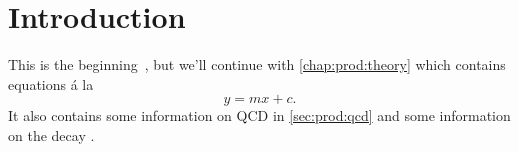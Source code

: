 \chapter{Introduction}
\label{chap:prod:introduction}

This is the beginning~\cite{PDG2014}, but we'll continue with 
\cref{chap:prod:theory} which contains equations \'a la
\begin{equation}
  y = mx + c.
  \label{eqn:foo}
\end{equation}
It also contains some information on \ac{QCD} in \cref{sec:prod:qcd} and some 
information on the decay \decay{\PLambdac}{\Pproton\PKp\PKm}.

\lipsum[1-12]
